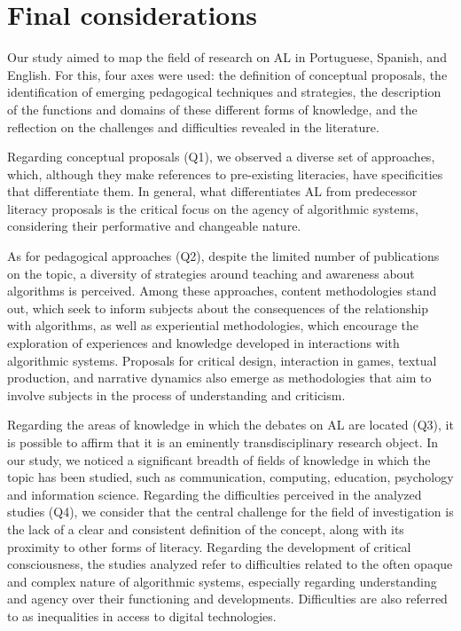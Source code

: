 \section{Final considerations}\label{sec-consideraçõesfinais}

Our study aimed to map the field of research on AL in Portuguese, Spanish, and English. For this, four axes were used: the definition of conceptual proposals, the identification of emerging pedagogical techniques and strategies, the description of the functions and domains of these different forms of knowledge, and the reflection on the challenges and difficulties revealed in the literature.

Regarding conceptual proposals (Q1), we observed a diverse set of approaches, which, although they make references to pre-existing literacies, have specificities that differentiate them. In general, what differentiates AL from predecessor literacy proposals is the critical focus on the agency of algorithmic systems, considering their performative and changeable nature.

As for pedagogical approaches (Q2), despite the limited number of publications on the topic, a diversity of strategies around teaching and awareness about algorithms is perceived. Among these approaches, content methodologies stand out, which seek to inform subjects about the consequences of the relationship with algorithms, as well as experiential methodologies, which encourage the exploration of experiences and knowledge developed in interactions with algorithmic systems. Proposals for critical design, interaction in games, textual production, and narrative dynamics also emerge as methodologies that aim to involve subjects in the process of understanding and criticism.

Regarding the areas of knowledge in which the debates on AL are located (Q3), it is possible to affirm that it is an eminently transdisciplinary research object. In our study, we noticed a significant breadth of fields of knowledge in which the topic has been studied, such as communication, computing, education, psychology and information science. Regarding the difficulties perceived in the analyzed studies (Q4), we consider that the central challenge for the field of investigation is the lack of a clear and consistent definition of the concept, along with its proximity to other forms of literacy. Regarding the development of critical consciousness, the studies analyzed refer to difficulties related to the often opaque and complex nature of algorithmic systems, especially regarding understanding and agency over their functioning and developments. Difficulties are also referred to as inequalities in access to digital technologies.

